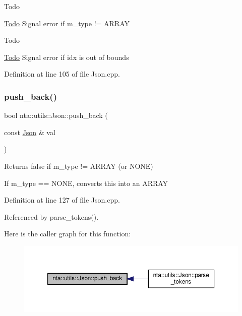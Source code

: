 \begin{DoxyRefDesc}{Todo}
\item[\hyperlink{todo__todo000023}{Todo}]Signal error if m\+\_\+type != A\+R\+R\+AY \end{DoxyRefDesc}
\begin{DoxyRefDesc}{Todo}
\item[\hyperlink{todo__todo000024}{Todo}]Signal error if idx is out of bounds \end{DoxyRefDesc}


Definition at line 105 of file Json.\+cpp.

\mbox{\label{classnta_1_1utils_1_1Json_a2015e471fd47c1a077ca752c9b1fabbd}} 
\subsubsection{\texorpdfstring{push\+\_\+back()}{push\_back()}}
{\footnotesize\ttfamily bool nta\+::utils\+::\+Json\+::push\+\_\+back (\begin{DoxyParamCaption}\item[{const \hyperlink{classnta_1_1utils_1_1Json}{Json} \&}]{val }\end{DoxyParamCaption})}

Returns false if m\+\_\+type != A\+R\+R\+AY (or N\+O\+NE)

If m\+\_\+type == N\+O\+NE, converts this into an A\+R\+R\+AY 

Definition at line 127 of file Json.\+cpp.



Referenced by parse\+\_\+tokens().

Here is the caller graph for this function\+:\nopagebreak
\begin{figure}[H]
\begin{center}
\leavevmode
\includegraphics[width=350pt]{d1/d3d/classnta_1_1utils_1_1Json_a2015e471fd47c1a077ca752c9b1fabbd_icgraph}
\end{center}
\end{figure}
\mbox{\label{classnta_1_1utils_1_1Json_a19f47693bafb5d8e0fe384e0357d0da1}} 
